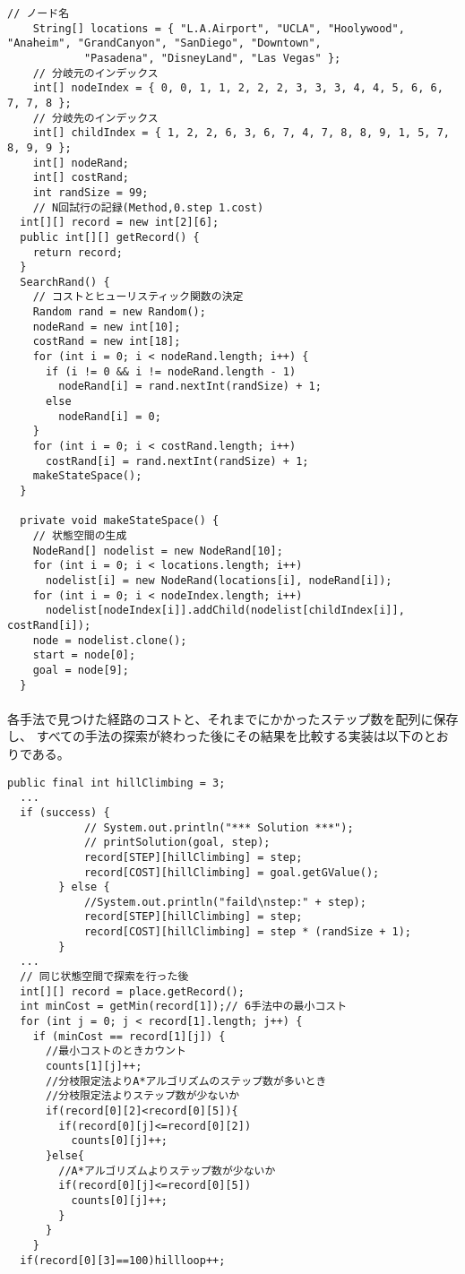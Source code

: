 \documentclass{jarticle}
\begin{document}
\begin{lstlisting}[caption=SearchRandクラスより抜粋]
  // ノード名
	String[] locations = { "L.A.Airport", "UCLA", "Hoolywood", "Anaheim", "GrandCanyon", "SanDiego", "Downtown",
			"Pasadena", "DisneyLand", "Las Vegas" };
	// 分岐元のインデックス
	int[] nodeIndex = { 0, 0, 1, 1, 2, 2, 2, 3, 3, 3, 4, 4, 5, 6, 6, 7, 7, 8 };
	// 分岐先のインデックス
	int[] childIndex = { 1, 2, 2, 6, 3, 6, 7, 4, 7, 8, 8, 9, 1, 5, 7, 8, 9, 9 };
	int[] nodeRand;
	int[] costRand;
	int randSize = 99;
	// N回試行の記録(Method,0.step 1.cost)
  int[][] record = new int[2][6];
  public int[][] getRecord() {
    return record;
  }
  SearchRand() {
    // コストとヒューリスティック関数の決定
    Random rand = new Random();
    nodeRand = new int[10];
    costRand = new int[18];
    for (int i = 0; i < nodeRand.length; i++) {
      if (i != 0 && i != nodeRand.length - 1)
        nodeRand[i] = rand.nextInt(randSize) + 1;
      else
        nodeRand[i] = 0;
    }
    for (int i = 0; i < costRand.length; i++)
      costRand[i] = rand.nextInt(randSize) + 1;
    makeStateSpace();
  }
  
  private void makeStateSpace() {
    // 状態空間の生成
    NodeRand[] nodelist = new NodeRand[10];
    for (int i = 0; i < locations.length; i++)
      nodelist[i] = new NodeRand(locations[i], nodeRand[i]);
    for (int i = 0; i < nodeIndex.length; i++)
      nodelist[nodeIndex[i]].addChild(nodelist[childIndex[i]], costRand[i]);
    node = nodelist.clone();
    start = node[0];
    goal = node[9];
  }
\end{lstlisting}

\paragraph{}
各手法で見つけた経路のコストと、それまでにかかったステップ数を配列に保存し、
すべての手法の探索が終わった後にその結果を比較する実装は以下のとおりである。

\begin{lstlisting}[caption=結果を保存し、比較]
	public final int hillClimbing = 3;
  ...
  if (success) {
			// System.out.println("*** Solution ***");
			// printSolution(goal, step);
			record[STEP][hillClimbing] = step;
			record[COST][hillClimbing] = goal.getGValue();
		} else {
			//System.out.println("faild\nstep:" + step);
			record[STEP][hillClimbing] = step;
			record[COST][hillClimbing] = step * (randSize + 1);
		}
  ...
  // 同じ状態空間で探索を行った後
  int[][] record = place.getRecord();
  int minCost = getMin(record[1]);// 6手法中の最小コスト
  for (int j = 0; j < record[1].length; j++) {
    if (minCost == record[1][j]) {
      //最小コストのときカウント
      counts[1][j]++;
      //分枝限定法よりA*アルゴリズムのステップ数が多いとき
      //分枝限定法よりステップ数が少ないか
      if(record[0][2]<record[0][5]){
        if(record[0][j]<=record[0][2])
          counts[0][j]++;
      }else{
        //A*アルゴリズムよりステップ数が少ないか
        if(record[0][j]<=record[0][5])
          counts[0][j]++;
        }
      }
    }
  if(record[0][3]==100)hillloop++;

\end{lstlisting}
\end{document}
